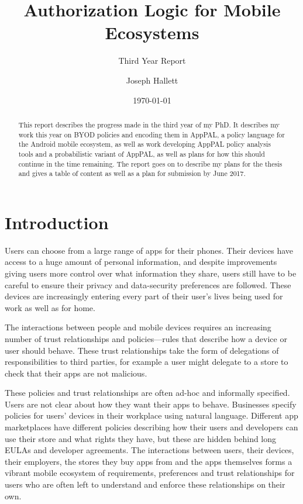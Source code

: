 \documentclass[a4paper]{scrartcl}
\title{Authorization Logic for Mobile Ecosystems}
\subtitle{Third Year Report}
\author{Joseph Hallett}
\date\today
\begin{document}
\maketitle

\begin{abstract}
  This report describes the progress made in the third year of my PhD. It
  describes my work this year on BYOD policies and encoding them in AppPAL, a
  policy language for the Android mobile ecosystem, as well as work developing
  AppPAL policy analysis tools and a probabilistic variant of AppPAL, as well as
  plans for how this should continue in the time remaining. The report goes on to
  describe my plans for the thesis and gives a table of content as well as a plan
  for submission by June 2017.
\end{abstract}

\section{Introduction}
\label{sec:introduction}

Users can choose from a large range of apps for their phones. Their devices have
access to a huge amount of personal information, and despite improvements giving
users more control over what information they share, users still have to be
careful to ensure their privacy and data-security preferences are followed.
These devices are increasingly entering every part of their user's lives being
used for work as well as for home.

The interactions between people and mobile devices requires an increasing number
of trust relationships and policies---rules that describe how a device or user
should behave. These trust relationships take the form of delegations of
responsibilities to third parties, for example a user might delegate to a store
to check that their apps are not malicious.


These policies and trust relationships are often ad-hoc and informally
specified. Users are not clear about how they want their apps to behave.
Businesses specify policies for users' devices in their workplace using natural
language. Different app marketplaces have different policies describing how
their users and developers can use their store and what rights they have, but
these are hidden behind long EULAs and developer agreements. The interactions
between users, their devices, their employers, the stores they buy apps from and
the apps themselves forms a vibrant mobile ecosystem of requirements,
preferences and trust relationships for users who are often left to understand
and enforce these relationships on their own.
\end{document}
